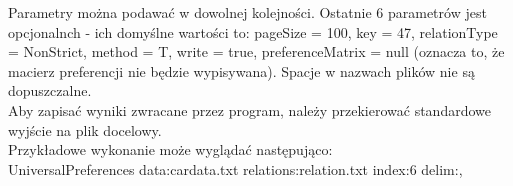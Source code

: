 \documentclass[a4paper,12pt]{article}
\begin{document}
Parametry można podawać w dowolnej kolejności. Ostatnie 6 parametrów jest opcjonalnch - ich domyślne wartości to: pageSize = 100, key = 47, relationType = NonStrict, method = T, write = true, preferenceMatrix = null (oznacza to, że macierz preferencji nie będzie wypisywana). Spacje w nazwach plików nie są dopuszczalne.\\

Aby zapisać wyniki zwracane przez program, należy przekierować standardowe wyjście na plik docelowy.\\

Przykładowe wykonanie może wyglądać następująco:\\

UniversalPreferences data:cardata.txt relations:relation.txt index:6 delim:,




\end{document}
